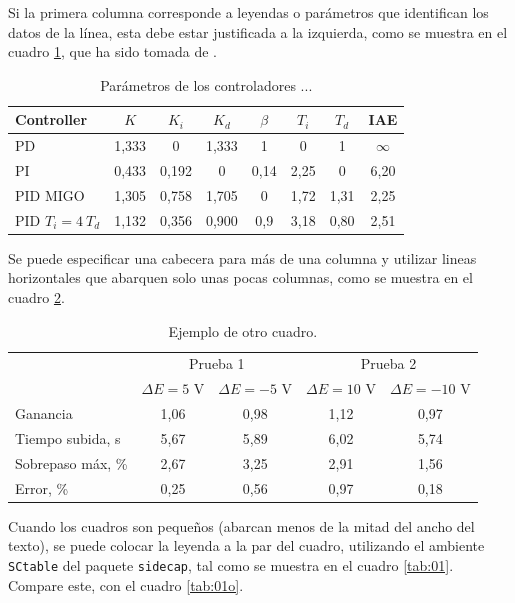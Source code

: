 Si la primera columna corresponde a leyendas o parámetros que identifican los datos de la línea, esta debe estar justificada a la izquierda, como se muestra en el cuadro \ref{tab:AH}, que ha sido tomada de \cite{astromhagglund2006}.

\begin{table}
\caption{Parámetros de los controladores ...} \label{tab:AH}
\begin{center}
    \begin{tabular}{@{}l*{7}{c}@{}}
    \toprule
    Controller & $K$ & $K_i$ & $K_d$ & $\beta$ & $T_i$ & $T_d$ & IAE \\
    \midrule
    PD &  1,333 & 0 & 1,333 & 1 & 0 &1 & $\infty$ \\
		PI & 0,433 & 0,192 & 0 & 0,14 & 2,25 & 0 & 6,20 \\
		PID MIGO & 1,305 & 0,758 & 1,705 & 0 & 1,72 & 1,31 & 2,25 \\
		PID $T_i=4 \ T_d$ & 1,132 & 0,356 & 0,900 & 0,9 & 3,18 & 0,80 & 2,51 \\
    \bottomrule
    \end{tabular}
\end{center}
\end{table}

Se puede especificar una cabecera para más de una columna y utilizar lineas horizontales que abarquen solo unas pocas columnas, como se muestra en el cuadro \ref{tab:muestra}.

\begin{table}
\caption{Ejemplo de otro cuadro.} \label{tab:muestra}
	\begin{tabular}{@{}l*{4}{c}@{}}
	\toprule
	& \multicolumn{2}{c}{Prueba 1} & \multicolumn{2}{c}{Prueba 2} \\
	\cmidrule(l{2pt}r{2pt}){2-3}\cmidrule(l{2pt}r{2pt}){4-5} 
	& $\Delta E=5$ V & $\Delta E = -5$ V & $\Delta E = 10$ V & $\Delta E = -10$ V \\
	\midrule
	Ganancia             &  1,06 & 0,98 & 1,12 & 0,97 \\
	Tiempo subida, s  &  5,67 & 5,89 & 6,02 & 5,74 \\
	Sobrepaso máx, \%        &  2,67 & 3,25 & 2,91 & 1,56 \\
	Error, \% &  0,25 & 0,56 & 0,97 & 0,18 \\
	\bottomrule
	\end{tabular}
\end{table}

\newpage
Cuando los cuadros son pequeños (abarcan menos de la mitad del ancho del texto), se puede colocar la leyenda a la par del cuadro, utilizando el ambiente \texttt{SCtable} del paquete \texttt{sidecap}, tal como se muestra en el cuadro \ref{tab:01}.  Compare este, con el cuadro \ref{tab:01o}.

